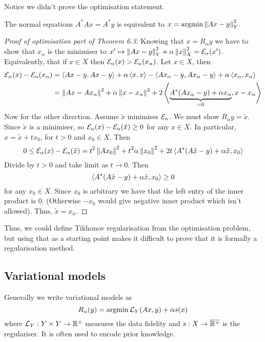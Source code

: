 \documentclass[12pt]{article}
\begin{document}
\begin{remark}
    Notice we didn't prove the optimisation statement.
\end{remark}
The normal equations $A^*Ax=A^*y$ is equivalent to $x=\operatorname{argmin} \left\lVert Ax -y\right\rVert_Y^2$. 
\begin{proof}[Proof of optimisation part of Theorem 6.3]
    Knowing that $x=R_\alpha y$ we have to show that $x_\alpha$ is the minimiser to $x'\mapsto \left\lVert Ax-y\right\rVert^2_Y+\alpha\left\lVert x\right\rVert^2_X=\mathcal{E}_\alpha(x')$. Equivalently, that if $x\in X$ then $\mathcal{E}_\alpha(x)>\mathcal{E}_\alpha(x_\alpha)$. Let $x\in X$, then 
    \begin{equation*}
        \begin{aligned}
            \mathcal{E}_\alpha(x) - \mathcal{E}_\alpha(x_\alpha) &= \left\langle Ax-y, Ax-y\right\rangle + \alpha\left\langle x, x\right\rangle-\left\langle Ax_\alpha-y, Ax_\alpha-y\right\rangle + \alpha\left\langle x_\alpha, x_\alpha\right\rangle\\
            &= \left\lVert Ax-Ax_\alpha\right\rVert^2 + \alpha \left\lVert x-x_\alpha\right\rVert^2 + 2\left\langle\underbrace{A^*(Ax_\alpha -y) + \alpha x_\alpha}_{=0}, x-x_\alpha\right\rangle
        \end{aligned}
    \end{equation*}
    Now for the other direction. Assume $\tilde{x}$ minimises $\mathcal{E}_\alpha$. We must show $R_\alpha y = \tilde{x}$. Since $\tilde{x}$ is a minimiser, so $\mathcal{E}_\alpha(x)-\mathcal{E}_\alpha(\tilde{x})\geq0$ for any $x\in X$. In particular, $x= \tilde{x} + t x_0$, for $t>0$ and $x_0\in X$. Then
    \begin{equation*}
        0\leq \mathcal{E}_\alpha(x)-\mathcal{E}_\alpha(\tilde{x}) = t^2 \left\lVert Ax_0\right\rVert^2 + t^2 \alpha \left\lVert x_0\right\rVert^2 + 2t \left\langle A^*(A\tilde{x}-y)+ \alpha \tilde{x}, x_0\right\rangle
    \end{equation*}
    Divide by $t>0$ and take limit as $t\to0$. Then
    \begin{equation*}
        \left\langle A^*(A\tilde{x}-y)+ \alpha \tilde{x}, x_0\right\rangle\geq 0
    \end{equation*}
    for any $x_0\in X$. Since $x_0$ is arbitrary we have that the left entry of the inner product is 0. (Otherwise $-x_0$ would give negative inner product which isn't allowed). Thus, $\tilde{x}=x_\alpha$. 
\end{proof}
Thus, we could define Tikhonov regularisation from the optimisation problem, but using that as a starting point makes it difficult to prove that it is formally a regularisation method.

\subsection*{Variational models}
Generally we write variational models as 
\begin{equation*}
    R_\alpha(y) = \operatorname{argmin} \mathcal{L}_Y(Ax,y) + \alpha s(x)
\end{equation*}
where $\mathcal{L}_Y:Y\times Y\to \mathbb{R}^+$ measures the data fidelity and $s:X\to\overline{\mathbb{R}^+}$ is the regulariser. It is often used to encode prior knowledge.
\end{document}
